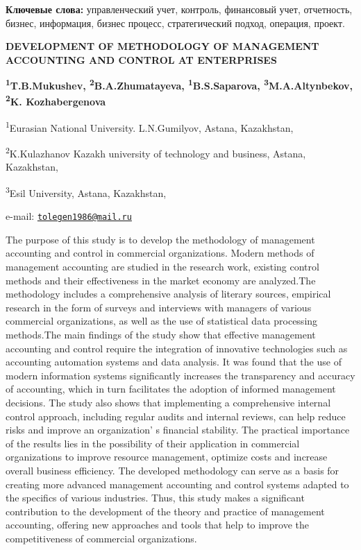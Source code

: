 {\bfseries Ключевые слова:} управленческий учет, контроль, финансовый учет,
отчетность, бизнес, информация, бизнес процесс, стратегический подход,
операция, проект.
\begin{articleheader}

{\bfseries DEVELOPMENT OF METHODOLOGY OF MANAGEMENT ACCOUNTING AND CONTROL
AT ENTERPRISES}

{\bfseries \textsuperscript{1}T.B.Mukushev\textsuperscript{\envelope },
\textsuperscript{2}B.A.Zhumatayeva, \textsuperscript{1}B.S.Saparova,
\textsuperscript{3}M.A.Altynbekov, \textsuperscript{2}K. Kozhabergenova}
\end{articleheader}
\begin{affiliation}

\textsuperscript{1}Eurasian National University. L.N.Gumilyov, Astana,
Kazakhstan,

\textsuperscript{2}K.Kulazhanov Kazakh university of technology and
business, Astana, Kazakhstan,

\textsuperscript{3}Esil University, Astana, Kazakhstan,

e-mail:
\href{mailto:tolegen1986@mail.ru}{\nolinkurl{tolegen1986@mail.ru}}
\end{affiliation}

The purpose of this study is to develop the methodology of management
accounting and control in commercial organizations. Modern methods of
management accounting are studied in the research work, existing control
methods and their effectiveness in the market economy are analyzed.The
methodology includes a comprehensive analysis of literary sources,
empirical research in the form of surveys and interviews with managers
of various commercial organizations, as well as the use of statistical
data processing methods.The main findings of the study show that
effective management accounting and control require the integration of
innovative technologies such as accounting automation systems and data
analysis. It was found that the use of modern information systems
significantly increases the transparency and accuracy of accounting,
which in turn facilitates the adoption of informed management decisions.
The study also shows that implementing a comprehensive internal control
approach, including regular audits and internal reviews, can help reduce
risks and improve an organization' s financial stability.
The practical importance of the results lies in the possibility of their
application in commercial organizations to improve resource management,
optimize costs and increase overall business efficiency. The developed
methodology can serve as a basis for creating more advanced management
accounting and control systems adapted to the specifics of various
industries. Thus, this study makes a significant contribution to the
development of the theory and practice of management accounting,
offering new approaches and tools that help to improve the
competitiveness of commercial organizations.

